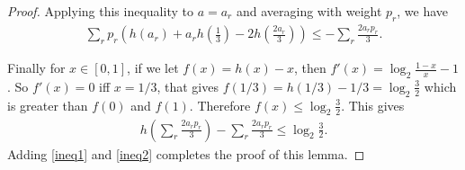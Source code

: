 \documentclass[10pt,a4paper]{amsart}
\begin{document}
\begin{proof}
Applying this inequality to $a=a_r$ and averaging with weight $p_r$, we have 
\begin{align} \label{ineq1}
\sum_r p_r\left(h(a_r)+a_rh\left(\frac{1}{3}\right)-2h\left(\frac{2a_r}{3}\right)\right) \le -\sum_r \frac{2a_rp_r}{3}.
\end{align}

Finally for $x \in [0,1]$, if we let $f(x)=h(x)-x$, then $f'(x)=\log_2 \frac{1-x}{x}-1$. So $f'(x)=0$ iff $x=1/3$, that gives $f(1/3)=h(1/3)-1/3=\log_2 \frac{3}{2}$ which is greater than $f(0)$ and $f(1)$. Therefore $f(x) \le \log_2 \frac{3}{2}.$ This gives
\begin{align}\label{ineq2}
h\left(\sum_r\frac{2a_rp_r}{3}\right) - \sum_r\frac{2a_rp_r}{3} \le \log_2 \frac{3}{2}.
\end{align}
Adding \eqref{ineq1} and \eqref{ineq2} completes the proof of this lemma.
\end{proof}
\end{document}
